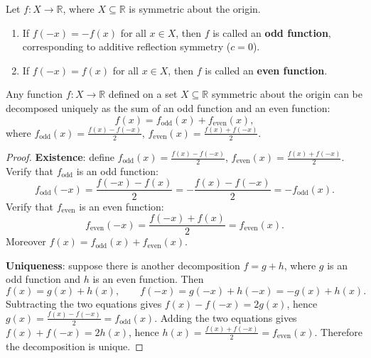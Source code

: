 \begin{definition}\label{def:parity}
Let $f: X \to \mathbb{R}$, where $X \subseteq \mathbb{R}$ is symmetric about the origin.
\begin{enumerate}[label=(\roman*)]
    \item If $f(-x) = -f(x)$ for all $x \in X$, then $f$ is called an \textbf{odd function}, corresponding to additive reflection symmetry ($c=0$).
    \item If $f(-x) = f(x)$ for all $x \in X$, then $f$ is called an \textbf{even function}.
\end{enumerate}
\end{definition}

\begin{theorem}\label{thm:parity_decomposition}
Any function $f: X \to \mathbb{R}$ defined on a set $X \subseteq \mathbb{R}$ symmetric about the origin can be decomposed uniquely as the sum of an odd function and an even function:
\[f(x) = f_{\text{odd}}(x) + f_{\text{even}}(x),\]
where $f_{\text{odd}}(x) = \frac{f(x)-f(-x)}{2}$, $f_{\text{even}}(x) = \frac{f(x)+f(-x)}{2}$.
\end{theorem}

\begin{proof}
\textbf{Existence}: define $f_{\text{odd}}(x) = \frac{f(x)-f(-x)}{2}$, $f_{\text{even}}(x) = \frac{f(x)+f(-x)}{2}$. Verify that $f_{\text{odd}}$ is an odd function:
\[
f_{\text{odd}}(-x) = \frac{f(-x)-f(x)}{2} = -\frac{f(x)-f(-x)}{2} = -f_{\text{odd}}(x).
\]
Verify that $f_{\text{even}}$ is an even function:
\[
f_{\text{even}}(-x) = \frac{f(-x)+f(x)}{2} = f_{\text{even}}(x).
\]
Moreover $f(x) = f_{\text{odd}}(x) + f_{\text{even}}(x)$.

\textbf{Uniqueness}: suppose there is another decomposition $f = g + h$, where $g$ is an odd function and $h$ is an even function. Then
\[
f(x) = g(x) + h(x), \qquad f(-x) = g(-x) + h(-x) = -g(x) + h(x).
\]
Subtracting the two equations gives $f(x) - f(-x) = 2g(x)$, hence $g(x) = \frac{f(x)-f(-x)}{2} = f_{\text{odd}}(x)$.
Adding the two equations gives $f(x) + f(-x) = 2h(x)$, hence $h(x) = \frac{f(x)+f(-x)}{2} = f_{\text{even}}(x)$.
Therefore the decomposition is unique.
\end{proof}

